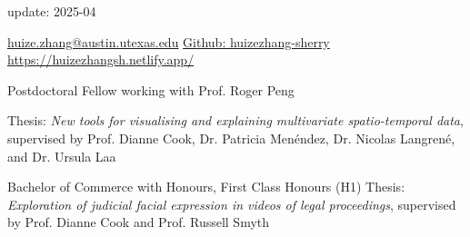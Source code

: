 \documentclass[10pt,a4paper]{article} %
\begin{document}
 


\begin{CJK}{UTF8}{gbsn}
\end{CJK}
\hfill
update: 2025-04
\spacedhrule{0.2em}{-0.4em} %

\vspace{0.25cm}
\noindent
\href{mailto:huize.zhang@austin.utexas.edu}{huize.zhang@austin.utexas.edu}
\hspace{4em}
\href{https://github.com/huizezhang-sherry/}{Github: huizezhang-sherry}
\hfill
\href{https://huizezhangsh.netlify.app/}{https://huizezhangsh.netlify.app/}




    {Postdoctoral Fellow working with Prof. Roger Peng
    }

    {Thesis: \textit{New tools for visualising and explaining multivariate spatio-temporal data},
    supervised by Prof. Dianne Cook, Dr. Patricia Men\'endez, Dr. Nicolas Langren\'e, and Dr. Ursula Laa 
    }

    {Bachelor of Commerce with Honours, First Class Honours (H1) \newline
    Thesis: \textit{Exploration of judicial facial expression in videos of legal proceedings}, supervised by Prof. Dianne Cook and Prof. Russell Smyth
    }
\end{document}
